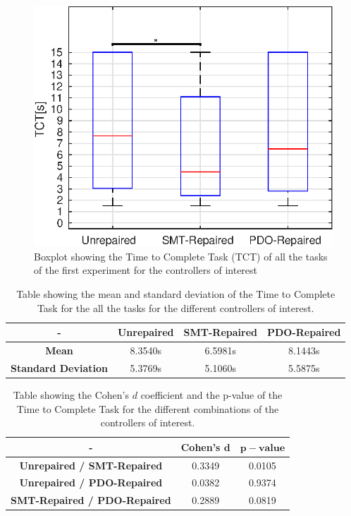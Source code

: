 \begin{figure}[H]
    \centering
    \includegraphics[width=\textwidth]{Images/first-experiment/exp0_TCT.eps}
    \caption{Boxplot showing the Time to Complete Task (TCT) of all the tasks of the first experiment for the controllers of interest}
    \label{fig:box-TCT-all-first}
\end{figure}
\begin{table}[H]
    \centering
    \begin{tabular}{|c|c|c|c|}
        \hline
        - & \textbf{Unrepaired} & \textbf{SMT-Repaired} & \textbf{PDO-Repaired} \\
        \hline
        \textbf{Mean} & 8.3540s & 6.5981s & 8.1443s \\
        \textbf{Standard Deviation} & 5.3769s & 5.1060s & 5.5875s \\
        \hline
    \end{tabular}
    \caption{Table showing the mean and standard deviation of the Time to Complete Task for the all the tasks for the different controllers of interest.}
    \label{tab:TCT-all-first-mean-std}
\end{table}
\begin{table}[H]
    \centering
    \begin{tabular}{|c|c|c|}
        \hline
        - & \textbf{Cohen's} $\mathbf{d}$ & $\mathbf{p-value}$ \\
        \hline
        \textbf{Unrepaired / SMT-Repaired} & 0.3349 & 0.0105 \\
        \textbf{Unrepaired / PDO-Repaired} & 0.0382 & 0.9374\\
        \textbf{SMT-Repaired / PDO-Repaired} & 0.2889 & 0.0819 \\
        \hline
    \end{tabular}
    \caption{Table showing the Cohen's $d$ coefficient and the p-value of the Time to Complete Task for the different combinations of the controllers of interest.}
    \label{tab:TCT-all-first-cohen-p}
\end{table}
